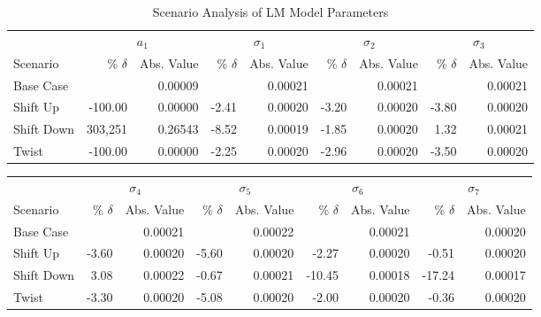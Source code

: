 \begin{table}[H]
  \centering
  \setlength{\tabcolsep}{5pt} 
  \caption{Scenario Analysis of LM Model Parameters}
  \label{tab:scenario_analysis_part_lm}
  \begin{threeparttable}
    \begin{tabular}{l *{4}{rr}}
      \toprule
      & \multicolumn{2}{c}{$a_1$} & \multicolumn{2}{c}{$\sigma_1$} & \multicolumn{2}{c}{$\sigma_2$} & \multicolumn{2}{c}{$\sigma_3$} \\
      \cmidrule(lr){2-3} \cmidrule(lr){4-5} \cmidrule(lr){6-7} \cmidrule(lr){8-9}
      Scenario & \% $\delta$ & Abs. Value & \% $\delta$ & Abs. Value & \% $\delta$ & Abs. Value & \% $\delta$ & Abs. Value \\
      \midrule
      
      Base Case          &             & 0.00009 &           & 0.00021 &           & 0.00021 &           & 0.00021 \\
      Shift Up   &   -100.00   & 0.00000 &   -2.41   & 0.00020 &   -3.20   & 0.00020 &   -3.80   & 0.00020 \\
      Shift Down & 303,251   & 0.26543 &   -8.52   & 0.00019 &   -1.85   & 0.00020 &    1.32   & 0.00021 \\
      Twist    &   -100.00   & 0.00000 &   -2.25   & 0.00020 &   -2.96   & 0.00020 &   -3.50   & 0.00020 \\
      \bottomrule
    \end{tabular}
  \end{threeparttable}
\end{table}

\begin{table}[H]
  \centering
  \setlength{\tabcolsep}{5pt}
  \begin{threeparttable}
    \begin{tabular}{l *{4}{rr}}
      & \multicolumn{2}{c}{$\sigma_4$} & \multicolumn{2}{c}{$\sigma_5$} & \multicolumn{2}{c}{$\sigma_6$} & \multicolumn{2}{c}{$\sigma_7$} \\
      \cmidrule(lr){2-3} \cmidrule(lr){4-5} \cmidrule(lr){6-7} \cmidrule(lr){8-9}
      Scenario & \% $\delta$ & Abs. Value & \% $\delta$ & Abs. Value & \% $\delta$ & Abs. Value & \% $\delta$ & Abs. Value \\
      \midrule
      
      Base Case          &           & 0.00021 &           & 0.00022 &           & 0.00021 &           & 0.00020 \\
      Shift Up   &   -3.60   & 0.00020 &   -5.60   & 0.00020 &   -2.27   & 0.00020 &   -0.51   & 0.00020 \\
      Shift Down &    3.08   & 0.00022 &   -0.67   & 0.00021 &  -10.45   & 0.00018 &  -17.24   & 0.00017 \\
      Twist    &   -3.30   & 0.00020 &   -5.08   & 0.00020 &   -2.00   & 0.00020 &   -0.36   & 0.00020 \\
      \bottomrule
    \end{tabular}
  \end{threeparttable}
\end{table}


